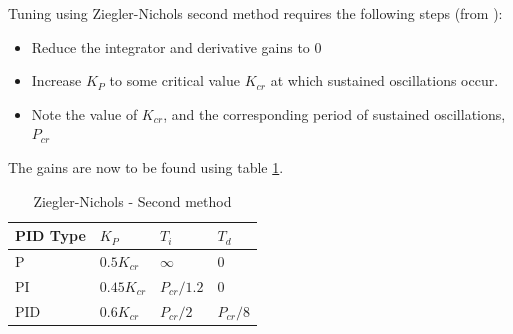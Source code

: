 Tuning using Ziegler-Nichols second method requires the following steps (from \citep{copeland2008}):

\begin{itemize}
	\item Reduce the integrator and derivative gains to 0
	\item Increase $K_P$ to some critical value $K_{cr}$ at which sustained oscillations occur. 
	\item Note the value of $K_{cr}$, and the corresponding period of sustained oscillations, $P_{cr}$
\end{itemize}

The gains are now to be found using table \ref{tbl:control_2}.

\begin{table}
\begin{center}
\caption{Ziegler-Nichols - Second method}
\begin{tabular}{| l | l | l | l |}
	\hline
	PID Type & $K_P$ & $T_i$ & $T_d$ \\ \hline
	P & $0.5 K_{cr}$ & $\infty$ & 0 \\ \hline
	PI & $0.45 K_{cr}$ & $P_{cr}/1.2$ & 0 \\ \hline
	PID & $0.6 K_{cr}$ & $P_{cr}/2$ & $P_{cr}/8$ \\ \hline
\end{tabular}
\label{tbl:control_2}
\end{center}
\end{table}


